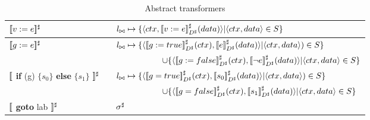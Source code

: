 \begin{table}
\footnotesize
\renewcommand{\arraystretch}{1.5}
\begin{tabular}{lcl}
\hline
$\lbrack\!\lbrack v:=e \rbrack\!\rbrack^{\sharp}$ & \hspace{0.1in} & $l_{\bowtie} \mapsto \{\langle ctx,\lbrack\!\lbrack v:=e \rbrack\!\rbrack^{\sharp}_{D^\sharp}(data) \rangle | \langle ctx,data \rangle \in S \}$
\\ 
\hline
$\lbrack\!\lbrack g:=e \rbrack\!\rbrack^{\sharp}$ & & $l_{\bowtie} \mapsto \{\langle \lbrack\!\lbrack g:=true \rbrack\!\rbrack^{\sharp}_{D^\sharp}(ctx),\lbrack\!\lbrack e \rbrack\!\rbrack^{\sharp}_{D^\sharp}(data) \rangle  | \langle ctx,data \rangle) \in S \}$ \\
& & ~~~~~~~~~~~$\cup \{ \langle \lbrack\!\lbrack g:=false \rbrack\!\rbrack^{\sharp}_{D^\sharp}(ctx),\lbrack\!\lbrack \neg e \rbrack\!\rbrack^{\sharp}_{D^\sharp}(data) \rangle | \langle ctx, data \rangle \in S \}$
\\ \hline
$\lbrack\!\lbrack$ \textbf{if} (g) $\{s_{0}\}$ \textbf{else} $\{s_{1}\}$ $\rbrack\!\rbrack^{\sharp}$ & & 
$l_{\bowtie} \mapsto \{\langle\lbrack\!\lbrack g=true \rbrack\!\rbrack^{\sharp}_{D^\sharp}(ctx),  \lbrack\!\lbrack s_0 \rbrack\!\rbrack^{\sharp}_{D^\sharp}(data) \rangle | \langle ctx,data \rangle) \in S \}$ \\
& & ~~~~~~~~~~~$\cup \{\langle \lbrack\!\lbrack g=false \rbrack\!\rbrack^{\sharp}_{D^\sharp}(ctx), \lbrack\!\lbrack s_1 \rbrack\!\rbrack^{\sharp}_{D^\sharp}(data) \rangle | \langle ctx,data \rangle \in S \}$
\\ \hline
$\lbrack\!\lbrack$ \textbf{goto} lab $\rbrack\!\rbrack^{\sharp}$ & & $\sigma^\sharp$
\\ \hline
\end{tabular}
\renewcommand{\arraystretch}{1}
\caption{Abstract transformers}\label{Ta:AbsTrans}
\end{table}
